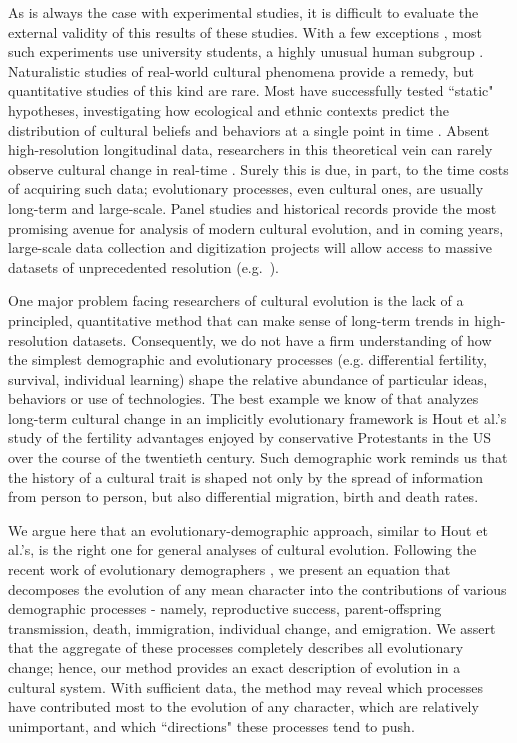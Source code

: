 As is always the case with experimental studies, it is difficult to evaluate the external validity of this results of these studies.  With a few exceptions \citep{paciotti2003ultimatum, efferson2007learning, chudek2011prestige}, most such experiments use university students, a highly unusual human subgroup \citep{henrich2010weirdest}. Naturalistic studies of real-world cultural phenomena provide a remedy, but quantitative studies of this kind are rare. Most have successfully tested ``static" hypotheses, investigating how ecological and ethnic contexts predict the distribution of cultural beliefs and behaviors at a single point in time \citep{paciotti2003ultimatum, mcelreath2004social, henrich2010evolution, henrich2011nature}. Absent high-resolution longitudinal data, researchers in this theoretical vein can rarely observe cultural change in real-time \citep{gravlee2009methods}. Surely this is due, in part, to the time costs of acquiring such data; evolutionary processes, even cultural ones, are usually long-term and large-scale. Panel studies and historical records provide the most promising avenue for analysis of modern cultural evolution, and in coming years, large-scale data collection and digitization projects will allow access to massive datasets of unprecedented resolution (e.g.~\citealp{michel2011quantitative}).

One major problem facing researchers of cultural evolution is the lack of a principled, quantitative method that can make sense of long-term trends in high-resolution datasets. Consequently, we do not have a firm understanding of how the simplest demographic and evolutionary processes (e.g. differential fertility, survival, individual learning) shape the relative abundance of particular ideas, behaviors or use of technologies.  The best example we know of that analyzes long-term cultural change in an implicitly evolutionary framework is Hout et al.'s \citeyearpar{hout2001demographic} study of the fertility advantages enjoyed by conservative Protestants in the US over the course of the twentieth century. Such demographic work reminds us that the history of a cultural trait is shaped not only by the spread of information from person to person, but also differential migration, birth and death rates.

We argue here that an evolutionary-demographic approach, similar to Hout et al.'s, is the right one for general analyses of cultural evolution. Following the recent work of evolutionary demographers \citep{coulson2008dynamics, ozgul2009dynamics}, we present an equation that decomposes the evolution of any mean character into the contributions of various demographic processes - namely, reproductive success, parent-offspring transmission, death, immigration, individual change, and emigration. We assert that the aggregate of these processes completely describes all evolutionary change; hence, our method provides an exact description of evolution in a cultural system.  With sufficient data, the method may reveal which processes have contributed most to the evolution of any character, which are relatively unimportant, and which ``directions" these processes tend to push.

